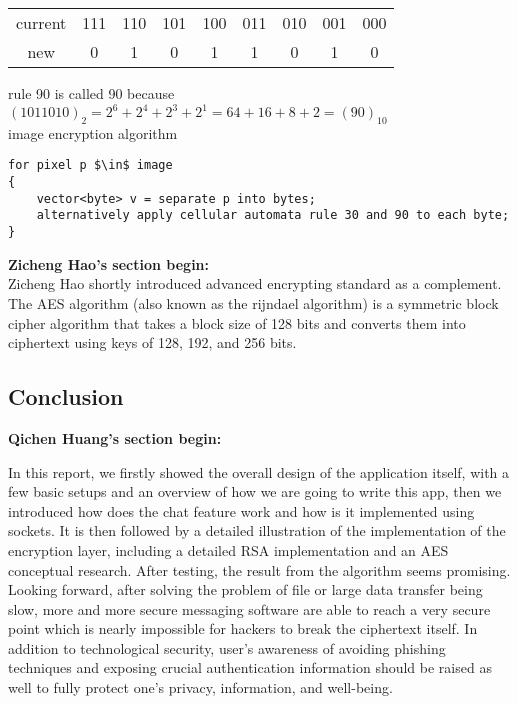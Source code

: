\documentclass[12pt, border = 4pt, multi]{article} %
\begin{document}
\begin{multicols}{2}
{\scriptsize
\begin{tabular}{ccccccccc}
current & 111 & 110 & 101 & 100 & 011 & 010 & 001 & 000\\
new & 0 & 1 & 0 & 1 & 1 & 0 & 1 & 0
\end{tabular}
}
rule 90 is called 90 because $(1011010)_2 = 2^6 + 2^4 + 2^3 + 2^1 = 64 + 16 + 8 + 2 = (90)_{10}$\\
image encryption algorithm
\begin{lstlisting}[mathescape = true]
for pixel p $\in$ image
{
    vector<byte> v = separate p into bytes;
    alternatively apply cellular automata rule 30 and 90 to each byte;
}
\end{lstlisting}
\end{multicols}
\textbf{Zicheng Hao's section begin:}\\
\noindent
Zicheng Hao shortly introduced advanced encrypting standard as a complement. The AES algorithm (also known as the rijndael algorithm) is a symmetric block cipher algorithm that takes a block size of 128 bits and converts them into ciphertext using keys of 128, 192, and 256 bits. 


\subsection*{Conclusion}
\textbf{Qichen Huang's section begin:}
\begin{multicols}{2}
\noindent 
In this report, we firstly showed the overall design of the application itself, with a few basic setups and an overview of how we are going to write this app, then we introduced how does the chat feature work and how is it implemented using sockets. It is then followed by a detailed illustration of the implementation of the encryption layer, including a detailed RSA implementation and an AES conceptual research. After testing, the result from the algorithm seems promising. Looking forward, after solving the problem of file or large data transfer being slow, more and more secure messaging software are able to reach a very secure point which is nearly impossible for hackers to break the ciphertext itself. In addition to technological security, user's awareness of avoiding phishing techniques and exposing crucial authentication information should be raised as well to fully protect one's privacy, information, and well-being.
\end{multicols}
\end{document}
